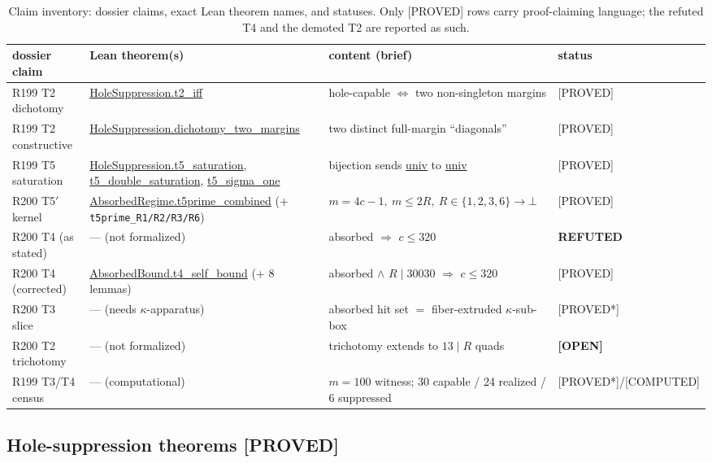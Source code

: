 \documentclass[11pt,a4paper]{article}
\theoremstyle{definition}
\begin{document}
\begin{table}[t]
  \centering
  \caption{Claim inventory: dossier claims, exact Lean theorem names,
    and statuses. Only [PROVED] rows carry proof-claiming language;
    the refuted T4 and the demoted T2 are reported as such.}
  \label{tab:inventory}
  \begin{tabular}{llll}
    \toprule
    dossier claim & Lean theorem(s) & content (brief) & status \\
    \midrule
    R199 T2 dichotomy
      & \url{HoleSuppression.t2_iff}
      & hole-capable $\iff$ two non-singleton margins
      & [PROVED] \\
    R199 T2 constructive
      & \url{HoleSuppression.dichotomy_two_margins}
      & two distinct full-margin ``diagonals''
      & [PROVED] \\
    R199 T5 saturation
      & \url{HoleSuppression.t5_saturation}, \newline
        \url{t5_double_saturation}, \newline
        \url{t5_sigma_one}
      & bijection sends \url{univ} to \url{univ}
      & [PROVED] \\
    R200 T5$'$ kernel
      & \url{AbsorbedRegime.t5prime_combined} \newline
        (+ \texttt{t5prime\_R1/R2/R3/R6})
      & $m{=}4c{-}1,\ m{\le}2R,\ R{\in}\{1,2,3,6\}\!\to\!\bot$
      & [PROVED] \\
    R200 T4 (as stated)
      & --- (not formalized)
      & absorbed $\Rightarrow$ $c\le320$
      & \textbf{REFUTED} \\
    R200 T4 (corrected)
      & \url{AbsorbedBound.t4_self_bound} \newline
        (+ 8 lemmas)
      & absorbed $\land$ $R\mid30030$ $\Rightarrow$ $c\le320$
      & [PROVED] \\
    R200 T3 slice
      & --- (needs $\kappa$-apparatus)
      & absorbed hit set $=$ fiber-extruded $\kappa$-sub-box
      & [PROVED*] \\
    R200 T2 trichotomy
      & --- (not formalized)
      & trichotomy extends to $13\mid R$ quads
      & \textbf{[OPEN]} \\
    R199 T3/T4 census
      & --- (computational)
      & $m{=}100$ witness; 30 capable / 24 realized / 6 suppressed
      & [PROVED*]/[COMPUTED] \\
    \bottomrule
  \end{tabular}
\end{table}

\subsection{Hole-suppression theorems [PROVED]}
\end{document}

